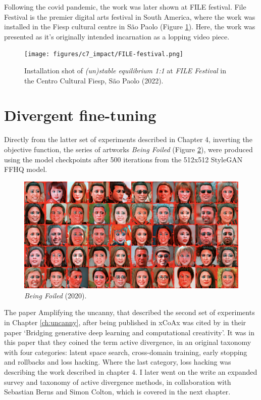 Following the covid pandemic, the work was later shown at FILE festival. 
File Festival is the premier digital arts festival in South America, where the work was installed in the Fiesp cultural centre in São Paolo (Figure \ref{fig:c7:file-festival}). 
Here, the work was presented as it’s originally intended incarnation as a lopping video piece.

\begin{figure}[!htb]
    \centering
    \captionsetup{justification=centering}
    \texttt{[image: figures/c7\_impact/FILE-festival.png]}
    \caption{Installation shot of \textit{(un)stable equilibrium 1:1} at \textit{FILE Festival} in the Centro Cultural Fiesp, São Paolo (2022).}
    \label{fig:c7:file-festival}
\end{figure}

\section{Divergent fine-tuning}


Directly from the latter set of experiments described in Chapter 4, inverting the objective function, the series of artworks \textit{Being Foiled} (Figure \ref{fig:c7:being-foiled}), were produced using the model checkpoints after 500 iterations from the 512x512 StyleGAN FFHQ model. 

\begin{figure}[!htb]
    \centering
    \captionsetup{justification=centering}
    \includegraphics[width=1\textwidth]{figures/c7_impact/being-foiled.png}
    \caption{\textit{Being Foiled} (2020).}
    \label{fig:c7:being-foiled}
\end{figure}

The paper Amplifying the uncanny, that described the second set of experiments in Chapter \ref{ch:uncanny}, after being published in xCoAx was cited by \cite{berns2020bridging} in their paper ‘Bridging generative deep learning and computational creativity’. 
It was in this paper that they coined the term active divergence, in an original taxonomy with four categories: latent space search, cross-domain training, early stopping and rollbacks and loss hacking. 
Where the last category, loss hacking was describing the work described in chapter 4. 
I later went on the write an expanded survey and taxonomy of active divergence methods, in collaboration with Sebastian Berns and Simon Colton, which is covered in the next chapter.

